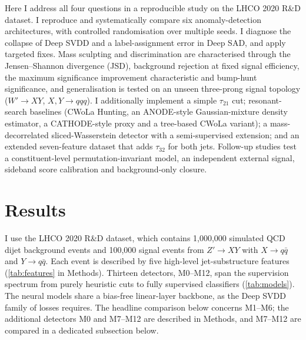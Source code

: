 \documentclass[11pt,a4paper]{article}
\newcommand{\subhead}[1]{\par\vspace{4pt}{\sffamily\bfseries\normalsize #1}\par\nopagebreak\vspace{1pt}}
\newcommand{\tautwo}{\tau_{21}}
\newcommand{\tauthree}{\tau_{32}}
\begin{document}
Here I address all four questions in a reproducible
study on the LHCO 2020 R\&D dataset. I reproduce and systematically
compare six anomaly-detection architectures, with controlled
randomisation over multiple seeds. I diagnose the collapse of Deep SVDD
and a label-assignment error in Deep SAD, and apply targeted fixes.
Mass sculpting and discrimination are characterised through the
Jensen--Shannon divergence (JSD), background rejection at fixed signal
efficiency, the maximum significance improvement characteristic and
bump-hunt significance, and generalisation is tested on an unseen
three-prong signal topology ($W' \to XY$, $X,Y \to qqq$). I additionally
implement a simple $\tautwo$ cut; resonant-search baselines (CWoLa Hunting, an
ANODE-style Gaussian-mixture density estimator, a CATHODE-style proxy and a tree-based
CWoLa variant); a mass-decorrelated sliced-Wasserstein detector with a semi-supervised
extension; and an extended seven-feature dataset that adds $\tauthree$ for both jets.
Follow-up studies test a constituent-level permutation-invariant model, an
independent external signal, sideband score calibration and background-only closure.

\section{Results}

\subhead{Benchmark overview}
I use the LHCO 2020 R\&D dataset,\cite{Kasieczka2021} which contains
1,000,000 simulated QCD dijet background events and 100,000 signal events
from $Z' \to XY$ with $X \to q\bar{q}$ and $Y \to q\bar{q}$. Each event is
described by five high-level jet-substructure features (\cref{tab:features} in Methods).
Thirteen detectors, M0--M12, span the supervision spectrum from purely heuristic cuts to
fully supervised classifiers (\cref{tab:models}). The neural models
share a bias-free linear-layer backbone, as the Deep SVDD family of
losses requires.\cite{Ruff2018,Ruff2020,Ruff2021} The headline comparison below concerns
M1--M6; the additional detectors M0 and M7--M12 are described in Methods, and
M7--M12 are compared in a dedicated subsection below.
\end{document}
